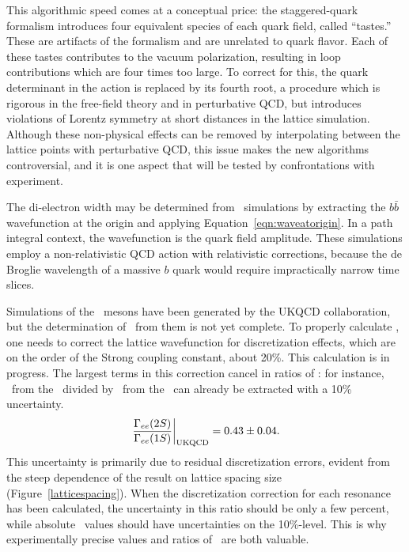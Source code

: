 \documentclass{cornell}
\begin{document}
This algorithmic speed comes at a conceptual price: the
staggered-quark formalism introduces four equivalent species of each
quark field, called ``tastes.''  These are artifacts of the formalism
and are unrelated to quark flavor.  Each of these tastes contributes
to the vacuum polarization, resulting in loop contributions which are
four times too large.  To correct for this, the quark determinant in
the action is replaced by its fourth root, a procedure which is
rigorous in the free-field theory and in perturbative QCD, but
introduces violations of Lorentz symmetry at short distances in the
lattice simulation.  Although these non-physical effects can be
removed by interpolating between the lattice points with perturbative
QCD, this issue makes the new algorithms controversial, and it is one
aspect that will be tested by confrontations with experiment.

The di-electron width may be determined from \ups\ simulations by
extracting the $b\bar{b}$ wavefunction at the origin and applying
Equation~\ref{eqn:waveatorigin}.  In a path integral context, the
wavefunction is the quark field amplitude.  These simulations employ a
non-relativistic QCD action with relativistic corrections, because the
de Broglie wavelength of a massive $b$ quark would require
impractically narrow time slices.

Simulations of the \ups\ mesons have been generated by the UKQCD
collaboration, but the determination of \gee\ from them is not yet
complete.  To properly calculate \gee, one needs to correct the
lattice wavefunction for discretization effects, which are on the
order of the Strong coupling constant, about 20\%.  This calculation
is in progress.  The largest terms in this correction cancel in ratios
of \gee: for instance, \gee\ from the \uss\ divided by \gee\ from the
\us\ can already be extracted with a 10\% uncertainty.
\begin{equation}
  \left. \frac{\Gamma_{ee}(2S)}{\Gamma_{ee}(1S)}
  \right|_{\mbox{\scriptsize UKQCD}} = 0.43 \pm 0.04 \mbox{.}
  \label{eqn:latticeresult}
\end{equation}
This uncertainty is primarily due to residual discretization errors,
evident from the steep dependence of the result on lattice spacing
size (Figure~\ref{latticespacing}).  When the discretization
correction for each resonance has been calculated, the uncertainty in
this ratio should be only a few percent, while absolute \gee\ values
should have uncertainties on the 10\%-level.  This is why
experimentally precise values and ratios of \gee\ are both valuable.
\end{document}
